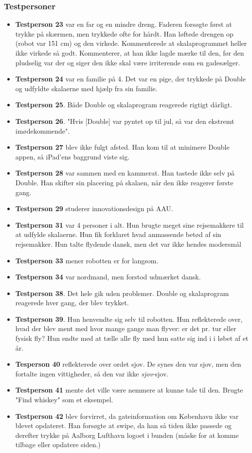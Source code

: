 \subsubsection{Testpersoner}
\begin{itemize}
\item \textbf{Testperson 23} var en far og en mindre dreng. Faderen forsøgte først at trykke på skærmen, men trykkede ofte for hårdt. Han løftede drengen op (robot var 151 cm) og den virkede. Kommenterede at skalaprogrammet heller ikke virkede så godt. Kommenterer, at han ikke lagde mærke til den, før den pludselig var der og siger den ikke skal være irriterende som en gadesælger.
\item \textbf{Testperson 24} var en familie på 4. Det var en pige, der trykkede på Double og udfyldte skalaerne med hjælp fra sin familie.
\item	\textbf{Testperson 25}. Både Double og skalaprogram reagerede rigtigt dårligt.
\item \textbf{Testperson 26}. "Hvis [Double] var pyntet op til jul, så var den ekstremt imødekommende".
\item \textbf{Testperson 27} blev ikke fulgt afsted. Han kom til at minimere Double appen, så iPad'ens baggrund viste sig.
\item \textbf{Testperson 28} var sammen med en kammerat. Han tastede ikke selv på Double. Han skifter sin placering på skalaen, når den ikke reagerer første gang.
\item \textbf{Testperson 29} studerer innovationsdesign på AAU.
\item	\textbf{Testperson 31} var 4 personer i alt. Hun brugte meget sine rejsemakkere til at udfylde skalaerne. Hun fik forklaret hvad anmassende betød af sin rejsemakker. Hun talte flydende dansk, men det var ikke hendes modersmål
\item \textbf{Testperson 33} mener robotten er for langsom.
\item \textbf{Testperson 34} var nordmand, men forstod udmærket dansk.
\item \textbf{Testperson 38}. Det hele gik uden problemer. Double og skalaprogram reagerede hver gang, der blev trykket.
\item \textbf{Testperson 39}. Hun henvendte sig selv til robotten. Hun reflekterede over, hvad der blev ment med hvor mange gange man flyver: er det pr. tur eller fysisk fly? Hun endte med at tælle alle fly med hun satte sig ind i i løbet af et år.
\item \textbf{Tesperson 40} reflekterede over ordet sjov. De synes den var sjov, men den fortalte ingen vittigheder, så den var ikke \textit{sjov}-sjov.
\item \textbf{Testperson 41} mente det ville være nemmere at kunne tale til den. Brugte "Find whiskey" som et eksempel.
\item \textbf{Testperson 42} blev forvirret, da gateinformation om København ikke var blevet opdateret. Han forsøgte at swipe, da han så tiden ikke passede og derefter trykke på Aalborg Lufthavn logoet i bunden (måske for at komme tilbage eller opdatere siden.)
\end{itemize}

